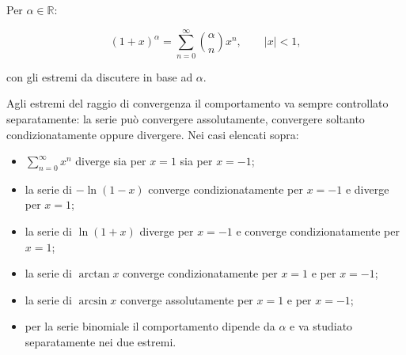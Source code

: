 Per \(\alpha\in\mathbb R\):

\[
(1+x)^\alpha
=\sum_{n=0}^{\infty}\binom{\alpha}{n}x^n,
\qquad |x|<1,
\]

con gli estremi da discutere in base ad \(\alpha\).

Agli estremi del raggio di convergenza il comportamento va sempre controllato separatamente: la serie può convergere assolutamente, convergere soltanto condizionatamente oppure divergere. Nei casi elencati sopra:

\begin{itemize}
\tightlist
\item
  \(\sum_{n=0}^{\infty}x^n\) diverge sia per \(x=1\) sia per \(x=-1\);
\item
  la serie di \(-\ln(1-x)\) converge condizionatamente per \(x=-1\) e diverge per \(x=1\);
\item
  la serie di \(\ln(1+x)\) diverge per \(x=-1\) e converge condizionatamente per \(x=1\);
\item
  la serie di \(\arctan x\) converge condizionatamente per \(x=1\) e per \(x=-1\);
\item
  la serie di \(\arcsin x\) converge assolutamente per \(x=1\) e per \(x=-1\);
\item
  per la serie binomiale il comportamento dipende da \(\alpha\) e va studiato separatamente nei due estremi.
\end{itemize}
